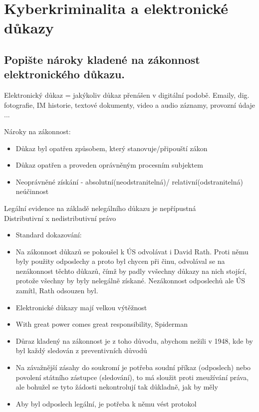 \section{Kyberkriminalita a elektronické důkazy}

\subsection{Popište nároky kladené na zákonnost elektronického důkazu.}
Elektronický důkaz = jakýkoliv důkaz přenášen v digitální podobě. Emaily, dig. fotografie, IM historie, textové dokumenty, video a audio záznamy, provozní údaje ...

Nároky na zákonnost:\begin{itemize}
    \item Důkaz byl opatřen způsobem, který stanovuje/připouští zákon
    \item Důkaz opatřen a proveden oprávněným procesním subjektem
    \item Neoprávněné získání - absolutní(neodstranitelná)/ relativní(odstranitelná) neúčinnost
\end{itemize}
Legální evidence na základě nelegálního důkazu je nepřípustná\\
Distributivní x nedistributivní právo
\begin{itemize}
    \item Standard dokazování: 
    \item Na zákonnost důkazů se pokoušel k ÚS odvolávat i David Rath. Proti němu byly použity odposlechy a proto byl chycen při činu, odvolával se na nezákonnost těchto důkazů, čímž by padly vvšechny důkazy na nich stojící, protože všechny by byly nelegálně získané. Nezákonnost odposlechů ale ÚS zamítl, Rath odsouzen byl.
    \item Elektronické důkazy mají velkou výtěžnost
    \item With great power comes great responsibility, Spiderman
    \item Důraz kladený na zákonnost je z toho důvodu, abychom nežili v 1948, kde by byl každý sledován z preventivních důvodů
    \item Na závažnější zásahy do soukromí je potřeba soudní příkaz (odposlech) nebo povolení státního zástupce (sledování), to má sloužit proti zneužívání práva, ale bohužel se tyto žádosti nekontrolují tak důkladně, jak by měly
    \item Aby byl odposlech legální, je potřeba k němu vést protokol
\end{itemize}


